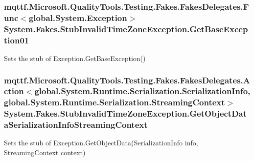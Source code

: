 \hypertarget{class_system_1_1_fakes_1_1_stub_invalid_time_zone_exception_a0524e6aef2d14b1fcdf2ece378750777}{
\subsubsection[{Get\-Base\-Exception01}]{\setlength{\rightskip}{0pt plus 5cm}mqttf.\-Microsoft.\-Quality\-Tools.\-Testing.\-Fakes.\-Fakes\-Delegates.\-Func$<$global.\-System.\-Exception$>$ System.\-Fakes.\-Stub\-Invalid\-Time\-Zone\-Exception.\-Get\-Base\-Exception01}}\label{class_system_1_1_fakes_1_1_stub_invalid_time_zone_exception_a0524e6aef2d14b1fcdf2ece378750777}


Sets the stub of Exception.\-Get\-Base\-Exception()

\hypertarget{class_system_1_1_fakes_1_1_stub_invalid_time_zone_exception_a4c513192674f21dc4e8bf12e19d00a76}{
\subsubsection[{Get\-Object\-Data\-Serialization\-Info\-Streaming\-Context}]{\setlength{\rightskip}{0pt plus 5cm}mqttf.\-Microsoft.\-Quality\-Tools.\-Testing.\-Fakes.\-Fakes\-Delegates.\-Action$<$global.\-System.\-Runtime.\-Serialization.\-Serialization\-Info, global.\-System.\-Runtime.\-Serialization.\-Streaming\-Context$>$ System.\-Fakes.\-Stub\-Invalid\-Time\-Zone\-Exception.\-Get\-Object\-Data\-Serialization\-Info\-Streaming\-Context}}\label{class_system_1_1_fakes_1_1_stub_invalid_time_zone_exception_a4c513192674f21dc4e8bf12e19d00a76}


Sets the stub of Exception.\-Get\-Object\-Data(\-Serialization\-Info info, Streaming\-Context context)

